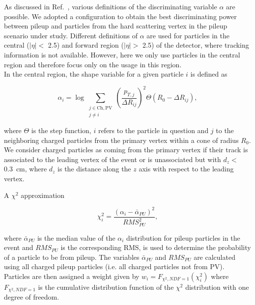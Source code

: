 As discussed in Ref.~\cite{Bertolini2014}, various definitions of the discriminating variable $\alpha$ are possible. 
We adopted a configuration to obtain the best discriminating power between pileup and particles from the hard scattering vertex in the pileup scenario under study. Different definitions of $\alpha$ are used for particles in the central ($|\eta| < $ 2.5) and forward region ($|\eta| > $ 2.5) of the detector, where tracking information is not available. However, here we only use particles in the central region and therefore focus only on the usage in this region.\\
In the central region, the shape variable for a given particle $i$ is defined as
%
\begin{linenomath}
\begin{equation}
  \alpha_i = \log \sum_{\substack{j \in \mathrm{Ch,PV} \\ j \neq i}} \left(\frac{p_{T,j}}{\Delta R_{ij}}\right)^{2} \Theta(R_0 - \Delta R_{ij}),
\end{equation}
\end{linenomath}
%
where $\Theta$ is the step function, $i$ refers to the particle in question and $j$ to the neighboring charged particles from the primary vertex within a cone of radius $R_0$. We consider charged particles as coming from the primary vertex if their track is associated to the leading vertex of the event or is unassociated but with $d_z < $0.3~cm, where $d_z$ is the distance along the $z$ axis with respect to the leading vertex. 

A $\chi^{2}$ approximation
\begin{linenomath}
\begin{equation}
\chi^{2}_{i} = \frac{(\alpha_i -  \bar{\alpha}_{PU})^{2}}{RMS_{PU}^{2}},
\end{equation}
\end{linenomath}
where $\bar{\alpha}_{PU}$ is the median value of the $\alpha_i$ distribution for pileup particles in the event and $RMS_{PU}$ is the corresponding RMS,
is used to determine the probability of a particle to be from pileup. 
The variables $\bar{\alpha}_{PU}$ and $RMS_{PU}$ are calculated using all charged pileup particles (i.e. all charged particles not from PV).
Particles are then assigned a weight given by $w_i = F_{\chi^2,NDF=1}(\chi^2_i)$ where $F_{\chi^2,NDF=1}$ is the cumulative distribution function of the $\chi^2$ distribution with one degree of freedom.

